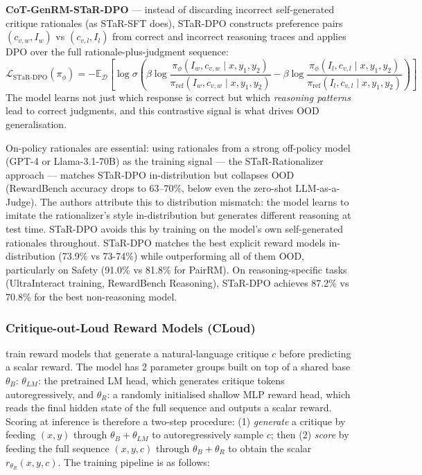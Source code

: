 \textbf{CoT-GenRM-STaR-DPO} --- instead of discarding incorrect self-generated critique rationales (as STaR-SFT does), STaR-DPO constructs preference pairs $(c_{v,w}, I_w)$ vs $(c_{v,l}, I_l)$ from correct and incorrect reasoning traces and applies DPO over the full rationale-plus-judgment sequence:
\begin{equation}
    \mathcal{L}_{\text{STaR-DPO}}(\pi_\phi) = -\mathbb{E}_{\mathcal{D}}\!\left[\log\sigma\!\left(\beta\log\frac{\pi_\phi(I_w, c_{v,w} \mid x, y_1, y_2)}{\pi_{\text{ref}}(I_w, c_{v,w} \mid x, y_1, y_2)} - \beta\log\frac{\pi_\phi(I_l, c_{v,l} \mid x, y_1, y_2)}{\pi_{\text{ref}}(I_l, c_{v,l} \mid x, y_1, y_2)}\right)\right]
    \label{eq:genrm_dpo}
\end{equation}
The model learns not just which response is correct but which \emph{reasoning patterns} lead to correct judgments, and this contrastive signal is what drives OOD generalisation.

On-policy rationales are essential: using rationales from a strong off-policy model (GPT-4 or Llama-3.1-70B) as the training signal --- the STaR-Rationalizer approach --- matches STaR-DPO in-distribution but collapses OOD (RewardBench accuracy drops to 63--70\%, below even the zero-shot LLM-as-a-Judge). The authors attribute this to distribution mismatch: the model learns to imitate the rationalizer's style in-distribution but generates different reasoning at test time. STaR-DPO avoids this by training on the model's own self-generated rationales throughout. STaR-DPO matches the best explicit reward models in-distribution (73.9\% vs 73-74\%) while outperforming all of them OOD, particularly on Safety (91.0\% vs 81.8\% for PairRM). On reasoning-specific tasks (UltraInteract training, RewardBench Reasoning), STaR-DPO achieves 87.2\% vs 70.8\% for the best non-reasoning model.

\subsubsection{Critique-out-Loud Reward Models (CLoud)}
\label{sec:cloud}

\autocite{ankner2024critiqueoutloudrewardmodels} train reward models that generate a natural-language critique $c$ before predicting a scalar reward. The model has 2 parameter groups built on top of a shared base $\theta_B$: $\theta_{LM}$: the pretrained LM head, which generates critique tokens autoregressively, and $\theta_R$: a randomly initialised shallow MLP reward head, which reads the final hidden state of the full sequence and outputs a scalar reward. Scoring at inference is therefore a two-step procedure: (1) \emph{generate} a critique by feeding $(x, y)$ through $\theta_B + \theta_{LM}$ to autoregressively sample $c$; then (2) \emph{score} by feeding the full sequence $(x, y, c)$ through $\theta_B + \theta_R$ to obtain the scalar $r_{\theta_R}(x, y, c)$. The training pipeline is as follows:

